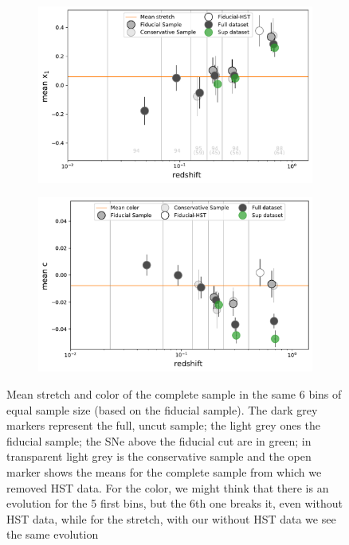 \documentclass[11pt,a4paper]{paper}
\begin{document}
\begin{figure}[htbp!]
    \centering
    \begin{subfigure}[t]{0.49\linewidth}
        \centering
        \includegraphics[width=\linewidth]{Answer_figures/mean_stretchs-nHST_full-sup.pdf}
    \end{subfigure}
    \begin{subfigure}[t]{0.49\linewidth}
        \centering
        \includegraphics[width=\linewidth]{Answer_figures/mean_colors-nHST_full-sup.pdf}
    \end{subfigure}
    \centering
    \captionsetup{justification=centering, size=small}
    \caption{Mean stretch and color of the complete sample in the same 6 bins of
        equal sample size (based on the fiducial sample). The dark grey markers
        represent the full, uncut sample; the light grey ones the fiducial
        sample; the SNe above the fiducial cut are in green; in transparent
        light grey is the conservative sample and the open marker shows the
        means for the complete sample from which we removed HST data. For the
        color, we might think that there is an evolution for the 5 first bins,
        but the 6th one breaks it, even without HST data, while for the stretch,
    with our without HST data we see the same evolution}
    \label{fig:means}
\end{figure}
\end{document}

